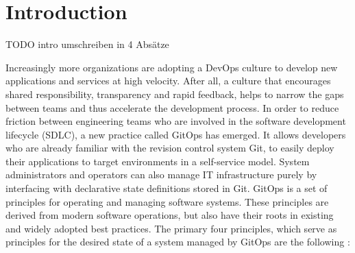 \chapter{Introduction}

\noindent
TODO intro umschreiben in 4 Absätze
\bigskip













\noindent
Increasingly more organizations are adopting 
a DevOps culture to develop new applications and services at high velocity. 
After all, a culture that encourages shared responsibility, transparency and rapid feedback, 
helps to narrow the gaps between teams and thus accelerate the development process.
In order to
reduce friction between engineering teams who are involved in the software development lifecycle (SDLC),
a new practice called GitOps has emerged.
It allows developers who are already familiar with the revision control system Git,
to easily deploy their applications to target environments in a self-service model.
System administrators and operators can also manage IT infrastructure
purely by interfacing with declarative state definitions stored in Git.
GitOps is a set of principles for operating and managing software systems.
These principles are derived from modern software operations, but also have their roots 
in existing and widely adopted best practices. The primary four principles,
which serve as principles for the desired state of a
system managed by GitOps are the following \autocite{gitopsPrinciplesv100}:

